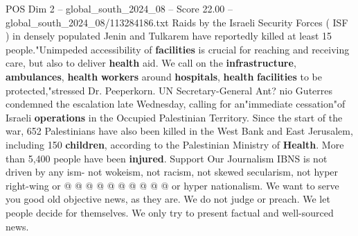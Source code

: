 \begin{textsample}{POS Dim 2 – global\_south\_2024\_08 – Score 22.00 – global\_south\_2024\_08/113284186.txt}
Raids by the Israeli Security Forces ( ISF ) in densely populated Jenin and Tulkarem have reportedly killed at least 15 people."Unimpeded accessibility of \textbf{facilities} is crucial for reaching and receiving care, but also to deliver \textbf{health} aid.
We call on the \textbf{infrastructure}, \textbf{ambulances}, \textbf{health} \textbf{workers} around \textbf{hospitals}, \textbf{health} \textbf{facilities} to be protected,"stressed Dr.
Peeperkorn.
UN Secretary-General Ant? nio Guterres condemned the escalation late Wednesday, calling for an"immediate cessation"of Israeli \textbf{operations} in the Occupied Palestinian Territory.
Since the start of the war, 652 Palestinians have also been killed in the West Bank and East Jerusalem, including 150 \textbf{children}, according to the Palestinian Ministry of \textbf{Health}.
More than 5,400 people have been \textbf{injured}.
Support Our Journalism IBNS is not driven by any ism- not wokeism, not racism, not skewed secularism, not hyper right-wing or @ @ @ @ @ @ @ @ @ @ or hyper nationalism.
We want to serve you good old objective news, as they are.
We do not judge or preach.
We let people decide for themselves.
We only try to present factual and well-sourced news.

\end{textsample}
